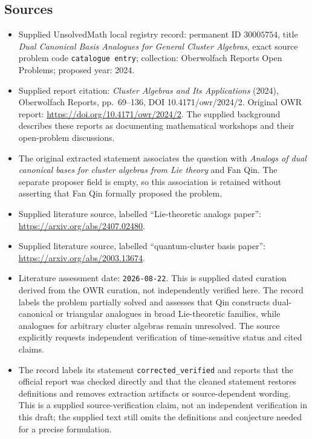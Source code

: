 \documentclass[11pt]{article}
\begin{document}
\subsection{Sources}
\begin{itemize}
\item Supplied UnsolvedMath local registry record: permanent ID \(30005754\), title \emph{Dual Canonical Basis Analogues for General Cluster Algebras}, exact source problem code \texttt{catalogue entry}; collection: Oberwolfach Reports Open Problems; proposed year: 2024.
\item Supplied report citation: \emph{Cluster Algebras and Its Applications} (2024), Oberwolfach Reports, pp.\ 69--136, DOI 10.4171/owr/2024/2. Original OWR report: \url{https://doi.org/10.4171/owr/2024/2}. The supplied background describes these reports as documenting mathematical workshops and their open-problem discussions.
\item The original extracted statement associates the question with \emph{Analogs of dual canonical bases for cluster algebras from Lie theory} and Fan Qin. The separate proposer field is empty, so this association is retained without asserting that Fan Qin formally proposed the problem.
\item Supplied literature source, labelled ``Lie-theoretic analogs paper'': \url{https://arxiv.org/abs/2407.02480}.
\item Supplied literature source, labelled ``quantum-cluster basis paper'': \url{https://arxiv.org/abs/2003.13674}.
\item Literature assessment date: \texttt{2026-08-22}. This is supplied dated curation derived from the OWR curation, not independently verified here. The record labels the problem partially solved and assesses that Qin constructs dual-canonical or triangular analogues in broad Lie-theoretic families, while analogues for arbitrary cluster algebras remain unresolved. The source explicitly requests independent verification of time-sensitive status and cited claims.
\item The record labels its statement \texttt{corrected\_verified} and reports that the official report was checked directly and that the cleaned statement restores definitions and removes extraction artifacts or source-dependent wording. This is a supplied source-verification claim, not an independent verification in this draft; the supplied text still omits the definitions and conjecture needed for a precise formulation.
\end{itemize}
\end{document}

